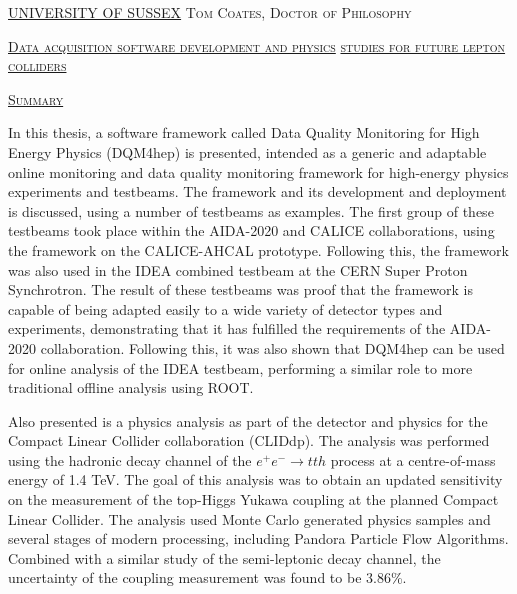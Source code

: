 \documentclass[a4paper,11pt]{report}
\newcommand{\linespacing}{1.5}
\renewcommand{\baselinestretch}{\linespacing}
\begin{document}
\thispagestyle{empty}
\newpage
\null\vskip10mm
\begin{center}
\large
\underline{UNIVERSITY OF SUSSEX}
\vskip20mm
\textsc{Tom Coates, Doctor of Philosophy}
\vskip20mm
\begin{center}
	\scshape
	\underline{Data acquisition software development and physics}
	\underline{studies for future lepton colliders}
\end{center}
\vskip0mm
\vskip20mm
\underline{\textsc{Summary}}
\vskip2mm
\end{center}
\renewcommand{\baselinestretch}{1.0}
\small\normalsize
In this thesis, a software framework called Data Quality Monitoring for High Energy Physics (DQM4hep) is presented, intended as a generic and adaptable online monitoring and data quality monitoring framework for high-energy physics experiments and testbeams. The framework and its development and deployment is discussed, using a number of testbeams as examples. The first group of these testbeams took place within the AIDA-2020 and CALICE collaborations, using the framework on the CALICE-AHCAL prototype. Following this, the framework was also used in the IDEA combined testbeam at the CERN Super Proton Synchrotron. The result of these testbeams was proof that the framework is capable of being adapted easily to a wide variety of detector types and experiments, demonstrating that it has fulfilled the requirements of the AIDA-2020 collaboration. Following this, it was also shown that DQM4hep can be used for online analysis of the IDEA testbeam, performing a similar role to more traditional offline analysis using ROOT.

Also presented is a physics analysis as part of the detector and physics for the Compact Linear Collider collaboration (CLIDdp). The analysis was performed using the hadronic decay channel of the $e^+e^- \rightarrow tth$ process at a centre-of-mass energy of 1.4 TeV. The goal of this analysis was to obtain an updated sensitivity on the measurement of the top-Higgs Yukawa coupling at the planned Compact Linear Collider. The analysis used Monte Carlo generated physics samples and several stages of modern processing, including Pandora Particle Flow Algorithms. Combined with a similar study of the semi-leptonic decay channel, the uncertainty of the coupling measurement was found to be 3.86\%.

\end{document}
